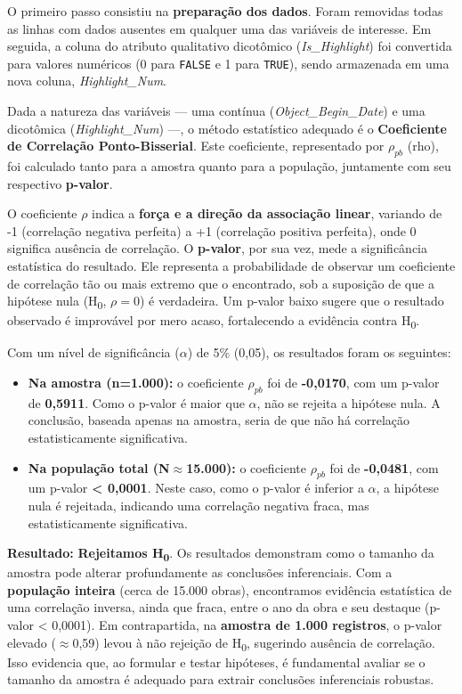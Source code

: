 \documentclass[11pt,a4paper]{article}
\begin{document}
O primeiro passo consistiu na \textbf{preparação dos dados}. Foram removidas todas as linhas com dados ausentes em qualquer uma das variáveis de interesse. Em seguida, a coluna do atributo qualitativo dicotômico (\textit{Is\_Highlight}) foi convertida para valores numéricos (0 para \texttt{FALSE} e 1 para \texttt{TRUE}), sendo armazenada em uma nova coluna, \textit{Highlight\_Num}.

Dada a natureza das variáveis — uma contínua (\textit{Object\_Begin\_Date}) e uma dicotômica (\textit{Highlight\_Num}) —, o método estatístico adequado é o \textbf{Coeficiente de Correlação Ponto-Bisserial}. Este coeficiente, representado por \(\rho_{pb}\) (rho), foi calculado tanto para a amostra quanto para a população, juntamente com seu respectivo \textbf{p-valor}.

O coeficiente \(\rho\) indica a \textbf{força e a direção da associação linear}, variando de -1 (correlação negativa perfeita) a +1 (correlação positiva perfeita), onde 0 significa ausência de correlação. O \textbf{p-valor}, por sua vez, mede a significância estatística do resultado. Ele representa a probabilidade de observar um coeficiente de correlação tão ou mais extremo que o encontrado, sob a suposição de que a hipótese nula (H\textsubscript{0}, \(\rho = 0\)) é verdadeira. Um p-valor baixo sugere que o resultado observado é improvável por mero acaso, fortalecendo a evidência contra H\textsubscript{0}.

Com um nível de significância ($\alpha$) de 5\% (0,05), os resultados foram os seguintes:
\begin{itemize}
    \item \textbf{Na amostra (n=1.000):} o coeficiente \(\rho_{pb}\) foi de \textbf{-0,0170}, com um p-valor de \textbf{0,5911}. Como o p-valor é maior que $\alpha$, não se rejeita a hipótese nula. A conclusão, baseada apenas na amostra, seria de que não há correlação estatisticamente significativa.
    \item \textbf{Na população total (N$\approx$15.000):} o coeficiente \(\rho_{pb}\) foi de \textbf{-0,0481}, com um p-valor \textbf{< 0,0001}. Neste caso, como o p-valor é inferior a $\alpha$, a hipótese nula é rejeitada, indicando uma correlação negativa fraca, mas estatisticamente significativa.
\end{itemize}

\textbf{Resultado:} \textbf{Rejeitamos H\textsubscript{0}}. Os resultados demonstram como o tamanho da amostra pode alterar profundamente as conclusões inferenciais. Com a \textbf{população inteira} (cerca de 15.000 obras), encontramos evidência estatística de uma correlação inversa, ainda que fraca, entre o ano da obra e seu destaque (p-valor < 0,0001). Em contrapartida, na \textbf{amostra de 1.000 registros}, o p-valor elevado ($\approx$0,59) levou à não rejeição de H\textsubscript{0}, sugerindo ausência de correlação. Isso evidencia que, ao formular e testar hipóteses, é fundamental avaliar se o tamanho da amostra é adequado para extrair conclusões inferenciais robustas.
\end{document}
